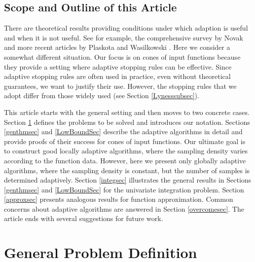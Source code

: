 \documentclass[]{elsarticle}
\theoremstyle{definition}
\theoremstyle{remark}
\begin{document}
\subsection{Scope and Outline of this Article} 
There are theoretical results providing conditions under which adaption is useful and when it is not useful. See for example, the comprehensive survey by Novak \cite{Nov96a} and more recent articles by Plaskota and Wasilkowski \cite{PlaWas05a,PlaEtal08a}. Here we consider a somewhat different situation.  Our focus is on cones of input functions because they provide a setting where adaptive stopping rules can be effective. Since adaptive stopping rules are often used in practice, even without theoretical guarantees, we want to justify their use.  However, the stopping rules that we adopt differ from those widely used (see Section \ref{Lynesssubsec}).

This article starts with the general setting and then moves to two concrete cases.  Section \ref{probdefsec} defines the problems to be solved and introduces our notation.  Sections \ref{genthmsec} and \ref{LowBoundSec} describe the adaptive algorithms in detail and provide proofs of their success for cones of input functions.  Our ultimate goal is to construct good locally adaptive algorithms, where the sampling density varies according to the function data.  However, here we present only globally adaptive algorithms, where the sampling density is constant, but the number of samples is determined adaptively.  Section \ref{integsec} illustrates the general results in Sections \ref{genthmsec} and \ref{LowBoundSec} for the univariate integration problem.  Section \ref{approxsec}  presents analogous results for function approximation.  Common concerns about adaptive algorithms are answered in Section \ref{overcomesec}. The article ends with several suggestions for future work.

\section{General Problem Definition} \label{probdefsec}
\end{document}
